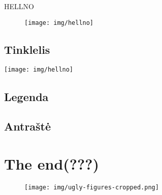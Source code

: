 \documentclass{beamer}
\makeatletter
\newcommand*{\currentname}{\@currentlabelname}
\makeatother
\begin{document}
\begin{frame}{\textcolor{text_grey}{HELL}NO}
  \begin{figure}[h]
    \texttt{[image: img/hellno]}
  \end{figure} 
\end{frame}


\subsection{Tinklelis}
\frame{\tableofcontents[currentsection, subsectionstyle=show/shaded/hide]}
\begin{frame}{\currentname}
  \texttt{[image: img/hellno]}
\end{frame}

\subsection{Legenda}
\frame{\tableofcontents[currentsection, subsectionstyle=show/shaded/hide]}

\subsection{Antraštė}
\frame{\tableofcontents[currentsection, subsectionstyle=show/shaded/hide]}

\section{The end(???)}
\frame{\tableofcontents[currentsection, subsectionstyle=show/shaded/hide]}

\begin{frame}
  \begin{figure}
    \begin{center} 
      \texttt{[image: img/ugly-figures-cropped.png]}
    \end{center}
  \end{figure}
\end{frame}
\end{document}
